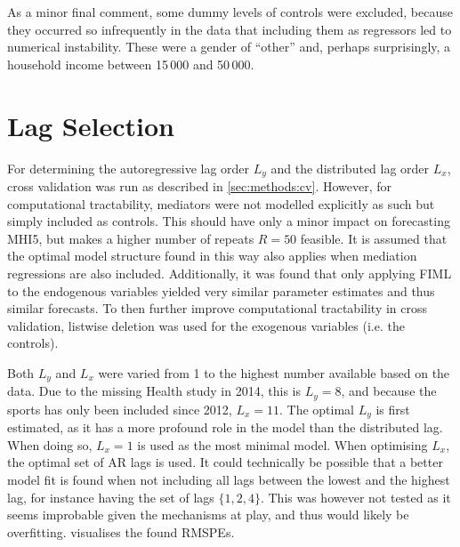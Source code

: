 As a minor final comment, some dummy levels of controls were excluded, because they occurred so infrequently in the data
that including them as regressors led to numerical instability.
These were a gender of ``other'' and, perhaps surprisingly, a household income between 15\,000 and 50\,000.

\section{Lag Selection}
\label{sec:modelling:lags}
For determining the autoregressive lag order $L_y$ and the distributed lag order $L_x$, cross validation was run as
described in \cref{sec:methods:cv}.
However, for computational tractability, mediators were not modelled explicitly as such but simply included as controls.
This should have only a minor impact on forecasting MHI5, but makes a higher number of repeats $R = 50$ feasible.
It is assumed that the optimal model structure found in this way also applies when mediation regressions are also
included.
Additionally, it was found that only applying FIML to the endogenous variables yielded very similar parameter estimates
and thus similar forecasts. To then further improve computational tractability in cross validation, listwise deletion
was used for the exogenous variables (i.e. the controls).

Both $L_y$ and $L_x$ were varied from 1 to the highest number available based on the data.
Due to the missing Health study in 2014, this is $L_y = 8$, and because the sports has only been included since 2012,
$L_x = 11$.
The optimal $L_y$ is first estimated, as it has a more profound role in the model than the distributed lag.
When doing so, $L_x = 1$ is used as the most minimal model. When optimising $L_x$, the optimal set of AR lags is used.
It could technically be possible that a better model fit is found when not including all lags between the lowest
and the highest lag, for instance having the set of lags $\{1, 2, 4\}$. This was however not tested as it seems improbable
given the mechanisms at play, and thus would likely be overfitting.
 visualises the found RMSPEs.

